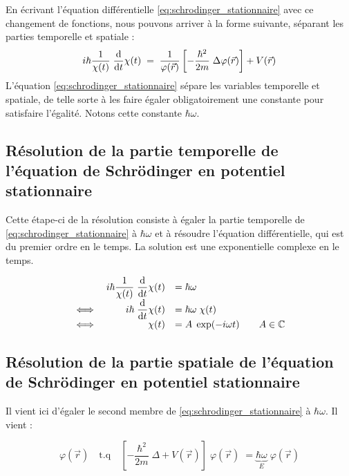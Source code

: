 \documentclass[12pt, a4paper]{book}
\begin{document}
En écrivant l'équation différentielle \eqref{eq:schrodinger_stationnaire} avec ce changement de fonctions, nous pouvons arriver à la forme suivante, séparant les parties temporelle et spatiale :
\begin{equation}
i\hbar \dfrac{1}{\chi(t)} \; \dfrac{\mathrm{d}}{\mathrm{d}t} \chi(t) \; = \; \dfrac{1}{\varphi(\vec r)} \left[ -\dfrac{\hbar ^2}{2m} \; \Delta \varphi(\vec r) \right] + V(\vec r)
\end{equation}
L'équation \eqref{eq:schrodinger_stationnaire} sépare les variables temporelle et spatiale, de telle sorte à les faire égaler obligatoirement une constante pour satisfaire l'égalité. Notons cette constante $\hbar \omega$. 
\subsection{Résolution de la partie temporelle de l'équation de Schrödinger en potentiel stationnaire}
Cette étape-ci de la résolution consiste à égaler la partie temporelle de \eqref{eq:schrodinger_stationnaire} à $\hbar \omega$ et à résoudre l'équation différentielle, qui est du premier ordre en le temps. La solution est une exponentielle complexe en le temps.

\begin{equation} \label{eq:resol_stat_temps}
\begin{array}{lrl r}
& i\hbar \dfrac{1}{\chi(t)} \; \dfrac{\mathrm{d}}{\mathrm{d}t} \chi(t) &= \hbar \omega  &\\
\iff& i \hbar \; \dfrac{\mathrm{d}}{\mathrm{d}t} \chi(t) &= \hbar \omega \;  \chi(t)  &\\
\iff & \chi(t) &= A \; \exp(-i\omega t)  &\quad A \in \mathbb{C}
\end{array}
\end{equation}


\subsection{Résolution de la partie spatiale de l'équation de Schrödinger en potentiel stationnaire}
Il vient ici d'égaler le second membre de \eqref{eq:schrodinger_stationnaire} à $\hbar \omega$. Il vient :

\begin{equation} \label{eq:resol_stat_pos}
\varphi(\vec r) \quad \mathrm{t.q} \quad \left[-\dfrac{\hbar ^2}{2m} \; \Delta + V(\vec r) \right] \; \varphi(\vec r) \; = \underbrace{\hbar	\omega}_E \; \varphi(\vec r)
\end{equation}
\end{document}

